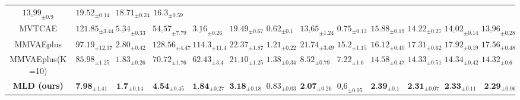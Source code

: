 \begin{table}[h]
{\begin{tabular}{c|cccc|cccc|cccc}
       $\underline{13.99}_{ \pm0.9}$   &
    $19.52_{ \pm 0.14 }$ &
    $18.71_{ \pm 0.24 }$  &
    $16.3_{ \pm 0.59 }$  
 

    \\


   \gls{MVTCAE} &    $121.85_{ \pm 3.44 }$   &   $\underline{5.34}_{ \pm 0.33 }$ &
    $\underline{54.57}_{ \pm 7.79 }$  &
    $\underline{3.16}_{ \pm 0.26 }$  &
 

        $19.49_{ \pm 0.67}$   & 
    $0.62_{ \pm 0.1}$ &
    $\underline{13.65}_{ \pm 1.24 }$  &
    $0.75_{ \pm 0.13 }$  &


        $15.88_{ \pm 0.19}$   &
        $14.22_{ \pm 0.27}$ &
    $\underline{14.02}_{ \pm 0.14 }$  &
    $\underline{13.96}_{ \pm 0.28}$
    \\

    
   \gls{MMVAEplus} &    
   
   $97.19_{ \pm 12.37 }$   &  
   $2.80_{ \pm 0.42 }$ &
    $128.56_{ \pm 4.47 }$  &
    $ 114.3_{ \pm 11.4 }$  &
 

        $22.37_{ \pm 1.87}$   & 
    $1.21_{ \pm 0.22}$ &
    $21.74_{ \pm 3.49 }$  &
    $15.2_{ \pm 1.15 }$  &


        $16.12_{ \pm 0.40}$   &
        $17.31_{ \pm 0.62}$ &
    $17.92_{ \pm 0.19 }$  &
    $17.56_{ \pm 0.48}$
    
    \\

     \gls{MMVAEplus}(K=10) &    
   
   $85.98_{ \pm 1.25 }$   &  
   $1.83_{ \pm 0.26 }$ &
    $70.72_{ \pm 1.76 }$  &
    $62.43_{ \pm 3.4  }$  &
 

        $21.10_{ \pm 1.25}$   & 
    $1.38_{ \pm 0.34}$ &
    $8.52_{ \pm 0.79 }$  &
    $7.22_{ \pm 1.6 }$  &


   $14.58_{ \pm 0.47 }$   &  
   $14.33_{ \pm 0.51 }$ &
    $14.34_{ \pm 0.42 }$  &
    $14.32_{ \pm 0.6 }$  
    
    \\
    \midrule
      
   \textbf{\gls{MLD} (ours) }&     $\textbf{7.98}_{ \pm 1.41 }$ & $\textbf{1.7}_{ \pm 0.14 }$ &
    $\textbf{4.54}_{ \pm 0.45 }$ & 
    $\textbf{1.84}_{ \pm 0.27 }$  &
 
      $\textbf{3.18}_{ \pm 0.18 }$ 
      & $0.83_{ \pm 0.03 }$ 
     & $\textbf{2.07}_{ \pm 0.26 }$ 
       & $\underline{0.6}_{ \pm 0.05}$ 
      

 & $ \textbf{2.39}_{ \pm 0.1 } $
        & $\textbf{2.31}_{ \pm 0.07 }$ 
     & $\textbf{2.33}_{ \pm 0.11 }$ 
       & $\textbf{	2.29}_{ \pm 0.06 }$ 
      
       \\

    \bottomrule
   
\end{tabular}}


 \label{qua:mhd_detailed}

\end{table}








